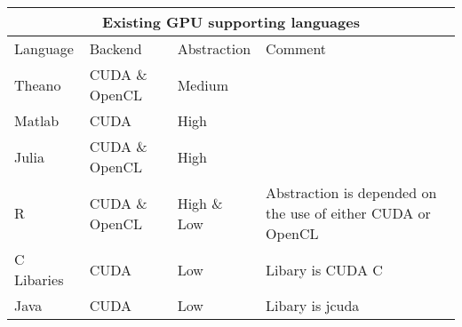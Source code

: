 \begin{tabular}{ |p{2cm}||p{3cm}|p{2cm}|p{5cm}|  }
 \multicolumn{4}{c}{Existing GPU supporting languages} \\
 \hline
Language & Backend &Abstraction &Comment\\
 \hline
 Theano&        CUDA \& OpenCL& Medium&\\
 \hline
 Matlab&        CUDA&           High&\\
 \hline
 Julia&         CUDA \& OpenCL& High&\\
 \hline
 R&             CUDA \& OpenCL& High \& Low&   Abstraction is depended on the use of either CUDA or OpenCL\\
 \hline
 C Libaries&    CUDA&           Low&            Libary is CUDA C\\
 \hline
 Java&          CUDA&           Low&            Libary is jcuda\\
 \hline
\end{tabular}
